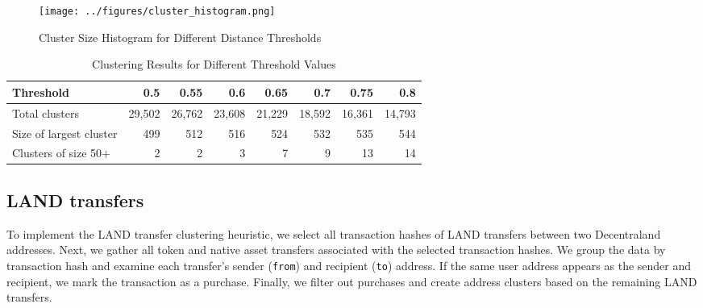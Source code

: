 \documentclass[12pt,a4paper,titlepage,oneside,english]{article}
\begin{document}
\begin{figure}[h!]
	\centering
	\texttt{[image: ../figures/cluster\_histogram.png]}
	\caption{Cluster Size Histogram for Different Distance Thresholds}
	\label{fig:threshold_sensitivity}
\end{figure}


\begin{table}[h!]
\scriptsize
  \centering
  \begin{tabular}{lrrrrrrr}
    \hline
	\textbf{Threshold} & \textbf{0.5} & \textbf{0.55} &\textbf{0.6} & \textbf{0.65} & \textbf{0.7} & \textbf{0.75} & \textbf{0.8} \\
	\hline
Total clusters 			& 29,502 & 26,762 & 23,608 & 21,229 & 18,592 & 16,361 & 14,793 \\
Size of largest cluster & 499 & 	512 & 516 & 	524 & 532 & 535 & 544\\
Clusters of size 50+ 	& 2 & 2 & 3 & 7 & 9  & 13 & 14\\
    \hline
  \end{tabular}
  \caption{Clustering Results for Different Threshold Values}
  \label{tbl:cluster_table}
\end{table}

\subsection{LAND transfers}
To implement the LAND transfer clustering heuristic, we select all transaction hashes of LAND transfers between two Decentraland addresses. Next, we gather all token and native asset transfers associated with the selected transaction hashes. We group the data by transaction hash and examine each transfer's sender (\texttt{from}) and recipient (\texttt{to}) address. If the same user address appears as the sender and recipient, we mark the transaction as a purchase. Finally, we filter out purchases and create address clusters based on the remaining LAND transfers.
\end{document}
